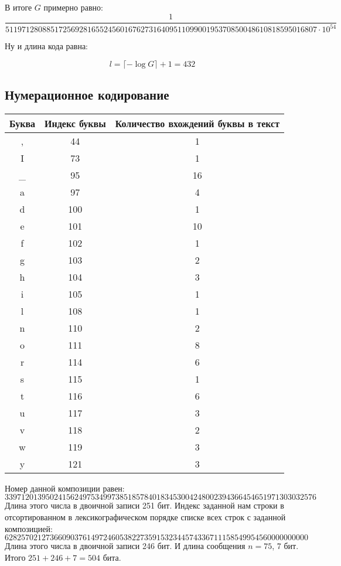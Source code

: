 В итоге $G$ примерно равно:
\begin{equation}
\frac1{5119712808851725692816552456016762731640951109900195370850048610818595016807 \cdot 10^{54}}
\end{equation}

Ну и длина кода равна:

\begin{equation}
    l = \lceil -\log G \rceil + 1 = 432
\end{equation}
\newpage
\subsection{Нумерационное кодирование}

\begin{center}
    \begin{longtable}{|c|c|c|}
    \hline
    Буква&Индекс буквы&Количество вхождений буквы в текст \\    
 \hline ,&44&1\\  \hline I&73&1\\  \hline \_&95&16\\  \hline a&97&4\\  \hline d&100&1\\  \hline e&101&10\\  \hline f&102&1\\  \hline g&103&2\\  \hline h&104&3\\  \hline i&105&1\\  \hline l&108&1\\  \hline n&110&2\\  \hline o&111&8\\  \hline r&114&6\\  \hline s&115&1\\  \hline t&116&6\\  \hline u&117&3\\  \hline v&118&2\\  \hline w&119&3\\  \hline y&121&3\\  \hline 
    \end{longtable}
\end{center}

Номер данной композиции равен:
$$
    3397120139502415624975349973851857840183453004248002394366454651971303032576
$$
Длина этого числа в двоичной записи 251 бит. Индекс заданной нам строки в отсортированном в лексикографическом порядке списке всех строк с заданной композицией:
$$
    62825702127366090376149724605382273591532344574336711158549954560000000000
$$
Длина этого числа в двоичной записи 246 бит. И длина сообщения $n = 75$, 7 бит. Итого $251+246+7=504$ бита.
